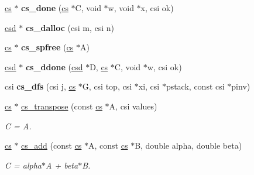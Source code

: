 \begin{DoxyCompactItemize}
\hyperlink{struct_mongoose_1_1cs__sparse}{cs} $\ast$ {\bfseries cs\+\_\+done} (\hyperlink{struct_mongoose_1_1cs__sparse}{cs} $\ast$C, void $\ast$w, void $\ast$x, csi ok)
\item 
\hypertarget{namespace_mongoose_a717587c618e588fbffe0ac282ee8a580}{}\label{namespace_mongoose_a717587c618e588fbffe0ac282ee8a580} 
\hyperlink{struct_mongoose_1_1cs__dmperm__results}{csd} $\ast$ {\bfseries cs\+\_\+dalloc} (csi m, csi n)
\item 
\hypertarget{namespace_mongoose_a091935bb14f70e4ca2875ea35617d9b3}{}\label{namespace_mongoose_a091935bb14f70e4ca2875ea35617d9b3} 
\hyperlink{struct_mongoose_1_1cs__sparse}{cs} $\ast$ {\bfseries cs\+\_\+spfree} (\hyperlink{struct_mongoose_1_1cs__sparse}{cs} $\ast$A)
\item 
\hypertarget{namespace_mongoose_a8dd64763b1b9de06458fc6ade81ea55e}{}\label{namespace_mongoose_a8dd64763b1b9de06458fc6ade81ea55e} 
\hyperlink{struct_mongoose_1_1cs__dmperm__results}{csd} $\ast$ {\bfseries cs\+\_\+ddone} (\hyperlink{struct_mongoose_1_1cs__dmperm__results}{csd} $\ast$D, \hyperlink{struct_mongoose_1_1cs__sparse}{cs} $\ast$C, void $\ast$w, csi ok)
\item 
\hypertarget{namespace_mongoose_a7e2c227f9682c652f423a5a17f4f5d0f}{}\label{namespace_mongoose_a7e2c227f9682c652f423a5a17f4f5d0f} 
csi {\bfseries cs\+\_\+dfs} (csi j, \hyperlink{struct_mongoose_1_1cs__sparse}{cs} $\ast$G, csi top, csi $\ast$xi, csi $\ast$pstack, const csi $\ast$pinv)
\item 
\hyperlink{struct_mongoose_1_1cs__sparse}{cs} $\ast$ \hyperlink{namespace_mongoose_afd7b4530c280c91c43ae695c8d515a42}{cs\+\_\+transpose} (const \hyperlink{struct_mongoose_1_1cs__sparse}{cs} $\ast$A, csi values)
\begin{DoxyCompactList}\small\item\em C = A\textquotesingle{}. \end{DoxyCompactList}\item 
\hyperlink{struct_mongoose_1_1cs__sparse}{cs} $\ast$ \hyperlink{namespace_mongoose_a2153d61eda5ac1e1b70617e8cf8cde33}{cs\+\_\+add} (const \hyperlink{struct_mongoose_1_1cs__sparse}{cs} $\ast$A, const \hyperlink{struct_mongoose_1_1cs__sparse}{cs} $\ast$B, double alpha, double beta)
\begin{DoxyCompactList}\small\item\em C = alpha$\ast$A + beta$\ast$B. \end{DoxyCompactList}\item 
\hypertarget{namespace_mongoose_a867fb9806212fa756422dd9b01cad293}{}\label{namespace_mongoose_a867fb9806212fa756422dd9b01cad293} 

\end{DoxyCompactItemize}
